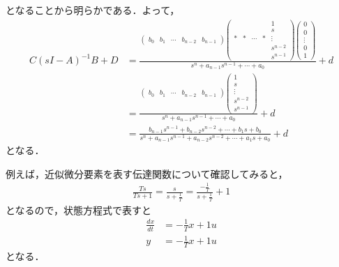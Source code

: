 となることから明らかである．よって，
\begin{align}
 C(sI-A)^{-1}B + D
 &=
 \frac{
    \left(\begin{array}{ccccc}
        b_0 & b_1 & \cdots & b_{n-2} & b_{n-1}
    \end{array}\right)
    \left(\begin{array}{ccccc}
        &    &        &    &  1 \\
	    &    &        &    &  s \\
	  * &  * & \cdots &  * &  \vdots \\
	    &    &        &    &  s^{n-2} \\
	    &    &        &    &  s^{n-1}
	\end{array}\right)
    \left(\begin{array}{c}
         0 \\
	 0 \\
	 \vdots \\
	 0 \\
	 1
	\end{array}\right)
 }
 {s^n + a_{n-1} s^{n-1}  + \cdots + a_0}
    + d
\nonumber\\[1cm]
 &=
 \frac{
    \left(\begin{array}{ccccc}
        b_0 & b_1 & \cdots & b_{n-2} & b_{n-1}
    \end{array}\right)
    \left(\begin{array}{c}
     1 \\
	 s \\
	 \vdots \\
	 s^{n-2} \\
	 s^{n-1}
	\end{array}\right)
 }
 {s^n + a_{n-1} s^{n-1}  + \cdots + a_0}
    + d
\nonumber \\[1cm]
 &=
   \frac{b_{n-1} s^{n-1} + b_{n-2} s^{n-2} + \cdots + b_1 s + b_0}
  {s^n + a_{n-1} s^{n-1} + a_{n-2} s^{n-2} + \cdots + a_1 s + a_0}
  + d
\end{align}
となる．

例えば，近似微分要素を表す伝達関数について確認してみると，
\begin{align}
 \frac{Ts}{Ts+1} = \frac{s}{s+\frac{1}{T}}
 = \frac{-\frac{1}{T}}{s+\frac{1}{T}} + 1
\end{align}
となるので，状態方程式で表すと
\begin{align}
 \frac{dx}{dt} &= -\frac{1}{T} x + 1u \\
 y             &= -\frac{1}{T} x + 1u
\end{align}
となる．


